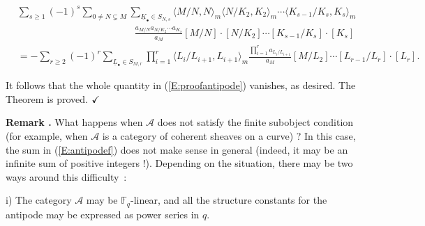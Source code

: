\documentclass[a4paper,10pt]{amsart}
\def\qed{$\hfill \checkmark$}
\numberwithin{equation}{section}
\begin{document}
\begin{equation*}
\begin{split}
&\sum_{s \geq 1} (-1)^s \sum_{0 \neq N \subsetneq M}\sum_{\underline{K}_{\bullet} \in S_{N,s}}
\langle M/N,N\rangle_m \langle N/K_2, K_2 \rangle_m \cdots \langle K_{s-1}/K_s,K_s \rangle_m\\
& \qquad \qquad \qquad \qquad \qquad \qquad \frac{a_{M/N} a_{N/K_2} \cdots a_{K_s}}{a_M} [M/N] \cdot [N/K_2] \cdots [K_{s-1}/K_s] \cdot [K_s]\\
&= -\sum_{r \geq 2} (-1)^r \sum_{\underline{L}_{\bullet} \in S_{M,r}} \prod_{i=1}^r \langle L_i/L_{i+1}, L_{i+1} \rangle_m \frac{\prod_{i=1}^r a_{L_i/L_{i+1}}}{a_M} [M/L_2] \cdots [L_{r-1}/L_r] \cdot [L_r].
\end{split}
\end{equation*}

It follows that the whole quantity in (\ref{E:proofantipode}) vanishes, as desired. The Theorem is proved. \qed

\vspace{.2in}

\addtocounter{theo}{1}
\noindent \textbf{Remark \thetheo .}  What happens when $\mathcal{A}$ does not satisfy the finite subobject condition (for example, when $\mathcal{A}$ is a category of coherent sheaves on a curve) ?
In this case, the sum in (\ref{E:antipodef}) does not make sense in general (indeed, it may be an infinite sum of positive integers !). Depending on the situation, there may be two ways around this difficulty~:

\vspace{.05in}

\noindent
i) The category $\mathcal{A}$ may be $\mathbb{F}_q$-linear, and all the structure constants for the antipode may be expressed as power series in $q$.

\vspace{.05in}
\end{document}
